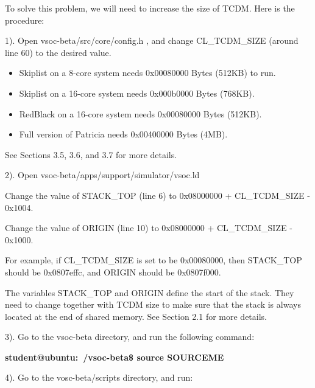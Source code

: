 \documentclass{article}
\begin{document}
To solve this problem, we will need to increase the size of TCDM. Here is the procedure:

\vspace{2mm}

1). Open vsoc-beta/src/core/config.h , and change CL\_TCDM\_SIZE (around line 60) to the desired value.

{
\addtolength{\leftskip}{6mm}

\vspace{-2mm}

\begin{itemize}
\item Skiplist on a 8-core system needs 0x00080000 Bytes (512KB) to run.
\item Skiplist on a 16-core system needs 0x000b0000 Bytes (768KB).
\item RedBlack on a 16-core system needs 0x00080000 Bytes (512KB).
\item Full version of Patricia needs 0x00400000 Bytes (4MB).
\end{itemize}

\vspace{-2mm}
See Sections 3.5, 3.6, and 3.7 for more details.

}

\vspace{2mm}
2). Open vsoc-beta/apps/support/simulator/vsoc.ld 

{
\addtolength{\leftskip}{6mm}

Change the value of STACK\_TOP (line 6) to 0x08000000 + CL\_TCDM\_SIZE - 0x1004.

Change the value of ORIGIN (line 10) to 0x08000000 + CL\_TCDM\_SIZE - 0x1000.

For example, if CL\_TCDM\_SIZE is set to be 0x00080000, then STACK\_TOP should be 0x0807effc, and ORIGIN should be 0x0807f000.

The variables STACK\_TOP and ORIGIN define the start of the stack. They need to change together with TCDM size to make sure that the stack is always located at the end of shared memory. See Section 2.1 for more details.

}

\vspace{2mm}
3). Go to the vsoc-beta directory, and run the following command:

{
\addtolength{\leftskip}{6mm}

{\bf student@ubuntu:~/vsoc-beta\$ source SOURCEME}

}

\vspace{2mm}
4). Go to the vosc-beta/scripts directory, and run:
\end{document}
